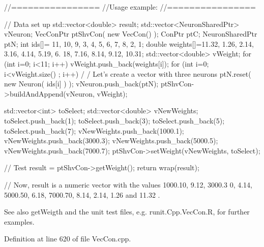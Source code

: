 \begin{DoxyCode}
        //================
        //Usage example:
        //================

        // Data set up
                std::vector<double> result;
                        std::vector<NeuronSharedPtr> vNeuron;
                        VecConPtr ptShvCon( new VecCon() );
                        ConPtr    ptC;
                        NeuronSharedPtr ptN;
                        int ids[]= {11, 10, 9, 3, 4, 5, 6, 7, 8, 2, 1};
                        double weights[]={11.32, 1.26, 2.14, 3.16, 4.14, 5.19, 6.
      18, 7.16, 8.14, 9.12, 10.31};
                        std::vector<double> vWeight;
                        for (int i=0; i<11; i++) {
                        vWeight.push_back(weights[i]);
                        }
                        for (int i=0; i<vWeight.size() ; i++) {                         /
      / Let's create a vector with three neurons
                        ptN.reset( new Neuron( ids[i] ) );
                        vNeuron.push_back(ptN);
                        }
                        ptShvCon->buildAndAppend(vNeuron, vWeight);

                        std::vector<int> toSelect;
                        std::vector<double> vNewWeights;
                        toSelect.push_back(1);
                        toSelect.push_back(3);
                        toSelect.push_back(5);
                        toSelect.push_back(7);
                        vNewWeights.push_back(1000.1);
                        vNewWeights.push_back(3000.3);
                        vNewWeights.push_back(5000.5);
                        vNewWeights.push_back(7000.7);
                        ptShvCon->setWeight(vNewWeights, toSelect);

        // Test
                        result = ptShvCon->getWeight();
                        return wrap(result);

        // Now, result is a numeric vector with the values  1000.10, 9.12, 3000.3
      0, 4.14, 5000.50, 6.18, 7000.70, 8.14, 2.14, 1.26 and 11.32 .
\end{DoxyCode}


\begin{DoxySeeAlso}{See also}
getWeigth and the unit test files, e.g. runit.Cpp.VecCon.R, for further examples. 
\end{DoxySeeAlso}


Definition at line 620 of file VecCon.cpp.



